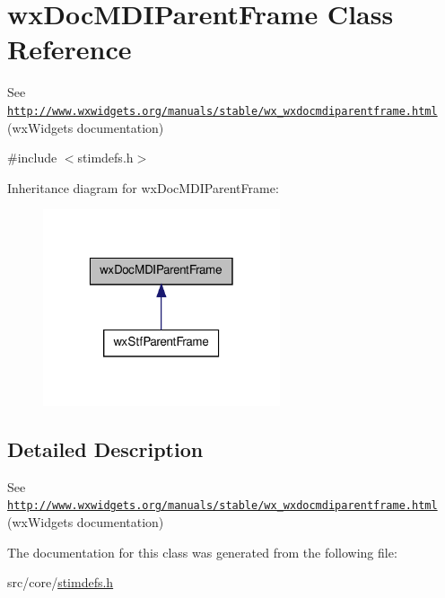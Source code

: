 \hypertarget{classwxDocMDIParentFrame}{
\section{wxDocMDIParentFrame Class Reference}
\label{classwxDocMDIParentFrame}
}


See \href{http://www.wxwidgets.org/manuals/stable/wx_wxdocmdiparentframe.html}{\tt http://www.wxwidgets.org/manuals/stable/wx\_\-wxdocmdiparentframe.html} (wxWidgets documentation)  




{\ttfamily \#include $<$stimdefs.h$>$}



Inheritance diagram for wxDocMDIParentFrame:
\nopagebreak
\begin{figure}[H]
\begin{center}
\leavevmode
\includegraphics[width=198pt]{classwxDocMDIParentFrame__inherit__graph}
\end{center}
\end{figure}


\subsection{Detailed Description}
See \href{http://www.wxwidgets.org/manuals/stable/wx_wxdocmdiparentframe.html}{\tt http://www.wxwidgets.org/manuals/stable/wx\_\-wxdocmdiparentframe.html} (wxWidgets documentation) 

The documentation for this class was generated from the following file:\begin{DoxyCompactItemize}
\item 
src/core/\hyperlink{stimdefs_8h}{stimdefs.h}\end{DoxyCompactItemize}
